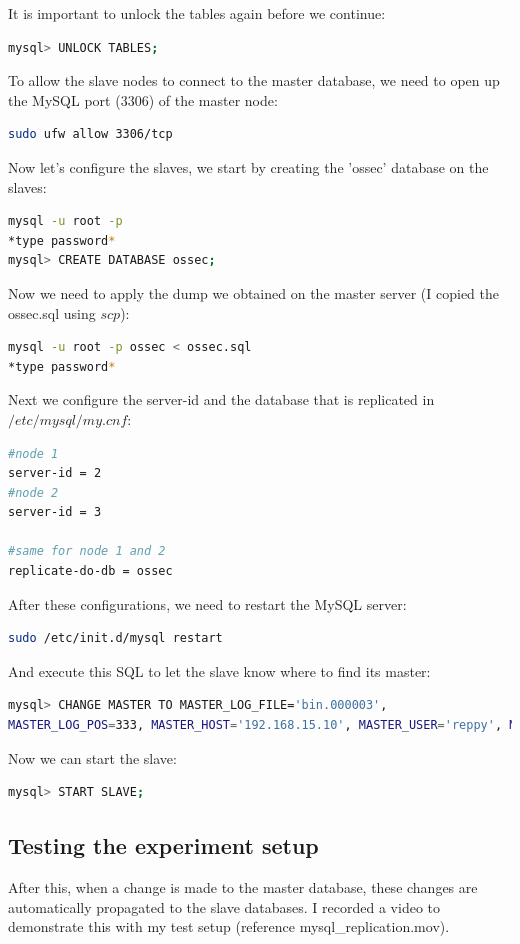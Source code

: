 \documentclass[12pt]{report}
\begin{document}
It is important to unlock the tables again before we continue:
\begin{lstlisting}[language=bash]
mysql> UNLOCK TABLES;
\end{lstlisting}

To allow the slave nodes to connect to the master database, we need to
open up the MySQL port ($3306$) of the master node:
\begin{lstlisting}[language=bash]
sudo ufw allow 3306/tcp
\end{lstlisting}

Now let's configure the slaves, we start by creating the 'ossec'
database on the slaves:
\begin{lstlisting}[language=bash]
mysql -u root -p
*type password*
mysql> CREATE DATABASE ossec;
\end{lstlisting}
Now we need to apply the dump we obtained on the master server (I
copied the ossec.sql using $scp$):
\begin{lstlisting}[language=bash]
mysql -u root -p ossec < ossec.sql
*type password*
\end{lstlisting}

Next we configure the server-id and the database that is replicated in
$/etc/mysql/my.cnf$:
\begin{lstlisting}[language=bash]
#node 1
server-id = 2 
#node 2
server-id = 3

#same for node 1 and 2
replicate-do-db = ossec
\end{lstlisting}

After these configurations, we need to restart the MySQL server:
\begin{lstlisting}[language=bash]
sudo /etc/init.d/mysql restart
\end{lstlisting}

And execute this SQL to let the slave know where to find its master:
\begin{lstlisting}[language=bash]
mysql> CHANGE MASTER TO MASTER_LOG_FILE='bin.000003',
MASTER_LOG_POS=333, MASTER_HOST='192.168.15.10', MASTER_USER='reppy', MASTER_PASSWORD='reppy_password';
\end{lstlisting}
Now we can start the slave:
\begin{lstlisting}[language=bash]
mysql> START SLAVE;
\end{lstlisting}

\subsection{Testing the experiment setup}
After this, when a change is made to the master database, these
changes are automatically propagated to the slave databases. I
recorded a video to demonstrate this with my test setup (reference
mysql\_replication.mov).
\end{document}
